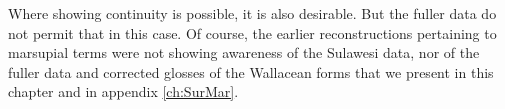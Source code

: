 Where showing continuity is possible,
it is also desirable.
But the fuller data do not permit that in this case.
Of course, the earlier reconstructions pertaining to marsupial
terms were not showing awareness of the Sulawesi data,
nor of the fuller data
and corrected glosses of the Wallacean forms that we present
in this chapter and in appendix \ref{ch:SurMar}.